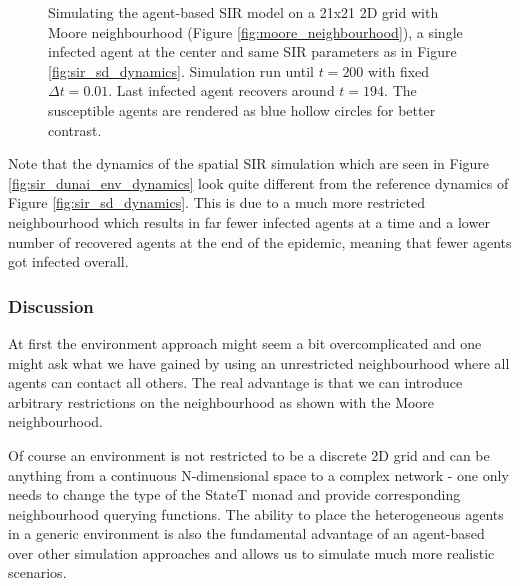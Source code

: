 \begin{figure}
\begin{center}
	\caption{Simulating the agent-based SIR model on a 21x21 2D grid with Moore neighbourhood (Figure \ref{fig:moore_neighbourhood}), a single infected agent at the center and same SIR parameters as in Figure \ref{fig:sir_sd_dynamics}. Simulation run until $t = 200$ with fixed $\Delta t = 0.01$. Last infected agent recovers around $t = 194$. The susceptible agents are rendered as blue hollow circles for better contrast.}
	\label{fig:sir_dunai}
\end{center}
\end{figure}

Note that the dynamics of the spatial SIR simulation which are seen in Figure \ref{fig:sir_dunai_env_dynamics} look quite different from the reference dynamics of Figure \ref{fig:sir_sd_dynamics}. This is due to a much more restricted neighbourhood which results in far fewer infected agents at a time and a lower number of recovered agents at the end of the epidemic, meaning that fewer agents got infected overall.

\subsubsection{Discussion}
At first the environment approach might seem a bit overcomplicated and one might ask what we have gained by using an unrestricted neighbourhood where all agents can contact all others. The real advantage is that we can introduce arbitrary restrictions on the neighbourhood as shown with the Moore neighbourhood.

Of course an environment is not restricted to be a discrete 2D grid and can be anything from a continuous N-dimensional space to a complex network - one only needs to change the type of the StateT monad and provide corresponding neighbourhood querying functions. The ability to place the heterogeneous agents in a generic environment is also the fundamental advantage of an agent-based over other simulation approaches and allows us to simulate much more realistic scenarios.